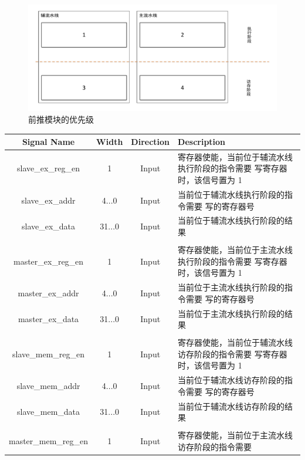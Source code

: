 \documentclass[blue,normal,cn,hide]{elegantbook}
\begin{document}
\begin{figure}[htpb]
    \centering
    \includegraphics[width=.8\textwidth]{figures/ForwardPriority}
    \caption{前推模块的优先级}
    \label{fig:ForwardingUnitPriority}
\end{figure}

\begin{table}
    \renewcommand\arraystretch{1.25}
    \centering
    \begin{tabular}{cccm{}}
        \toprule 
        \rowcolor{black!20} \textbf{Signal Name} & \textbf{Width} & \textbf{Direction} & \textbf{Description} \\
        \midrule
        slave\_ex\_reg\_en & 1 & Input & 寄存器使能，当前位于辅流水线执行阶段的指令需要
        写寄存器时，该信号置为 1 \\
        slave\_ex\_addr & 4...0 & Input & 当前位于辅流水线执行阶段的指令需要
        写的寄存器号 \\
        slave\_ex\_data & 31...0 & Input & 当前位于辅流水线执行阶段的结果 \\
        \\
        master\_ex\_reg\_en & 1 & Input & 寄存器使能，当前位于主流水线执行阶段的指令需要
        写寄存器时，该信号置为 1 \\
        master\_ex\_addr & 4...0 & Input & 当前位于主流水线执行阶段的指令需要
        写的寄存器号 \\
        master\_ex\_data & 31...0 & Input & 当前位于主流水线执行阶段的结果 \\
        \\
        slave\_mem\_reg\_en & 1 & Input & 寄存器使能，当前位于辅流水线访存阶段的指令需要
        写寄存器时，该信号置为 1 \\
        slave\_mem\_addr & 4...0 & Input & 当前位于辅流水线访存阶段的指令需要
        写的寄存器号 \\
        slave\_mem\_data & 31...0 & Input & 当前位于辅流水线访存阶段的结果 \\
        \\
        master\_mem\_reg\_en & 1 & Input & 寄存器使能，当前位于主流水线访存阶段的指令需要

\end{tabular}
\end{table}
\end{document}
